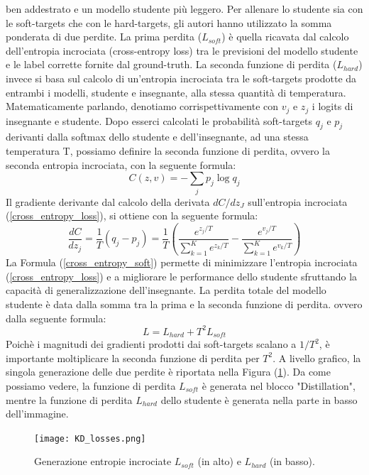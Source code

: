 ben addestrato e un modello studente più leggero. Per allenare lo studente 
sia con le soft-targets che con le hard-targets, gli autori hanno utilizzato la 
somma ponderata di due perdite. La prima perdita ($L_{soft}$) è quella ricavata 
dal calcolo dell'entropia incrociata (cross-entropy loss) tra le previsioni del 
modello studente e le label corrette fornite dal ground-truth. La seconda 
funzione di perdita ($L_{hard}$) invece si basa sul calcolo di un'entropia incrociata 
tra le soft-targets prodotte da entrambi i modelli, studente e insegnante, 
alla stessa quantità di temperatura. Matematicamente parlando, denotiamo 
corrispettivamente con $v_j$ e $z_j$ i logits di insegnante e studente. Dopo esserci 
calcolati le probabilità soft-targets $q_j$ e $p_j$ derivanti dalla softmax dello 
studente e dell'insegnante, ad una stessa temperatura T, possiamo definire 
la seconda funzione di perdita, ovvero la seconda entropia incrociata, con la 
seguente formula:
\begin{equation}\label{cross_entropy_loss}
    C(z,v) = -\sum_jp_j \log{q_j}
\end{equation}
Il gradiente derivante dal calcolo della derivata $dC/dz_J$ sull'entropia incrociata 
(\ref{cross_entropy_loss}), si ottiene con la seguente formula:
\begin{equation}\label{cross_entropy_soft}
    \frac{dC}{dz_j}=\frac{1}{T}(q_j-p_j)=\frac{1}{T}\left(\frac{e^{z_j/T}}{\sum_{k=1}^K e^{z_k/T}}-\frac{e^{v_j/T}}{\sum_{k=1}^K e^{v_k/T}}\right)
\end{equation}
La Formula (\ref{cross_entropy_soft}) permette di minimizzare l'entropia incrociata (\ref{cross_entropy_loss}) 
e a migliorare le performance dello studente sfruttando la capacità di 
generalizzazione dell'insegnante. La perdita totale del modello studente è 
data dalla somma tra la prima e la seconda funzione di perdita. ovvero 
dalla seguente formula:
\begin{equation}
    L= L_{hard}+T^2L_{soft}
\end{equation}
Poichè i magnitudi dei gradienti prodotti dai soft-targets scalano a $1/T^2$, 
è importante moltiplicare la seconda funzione di perdita per $T^2$. A livello 
grafico, la singola generazione delle due perdite è riportata nella Figura 
(\ref{l_hard_soft}). Da come possiamo vedere, la funzione di perdita $L_{soft}$ è generata 
nel blocco "Distillation", mentre la funzione di perdita $L_{hard}$ dello studente 
è generata nella parte in basso dell'immagine.
\begin{figure}
    \centering
    \texttt{[image: KD\_losses.png]}
    \centering
    \caption{Generazione entropie incrociate $L_{soft}$ (in alto) e $L_{hard}$ (in basso).}
    \label{l_hard_soft}
\end{figure}